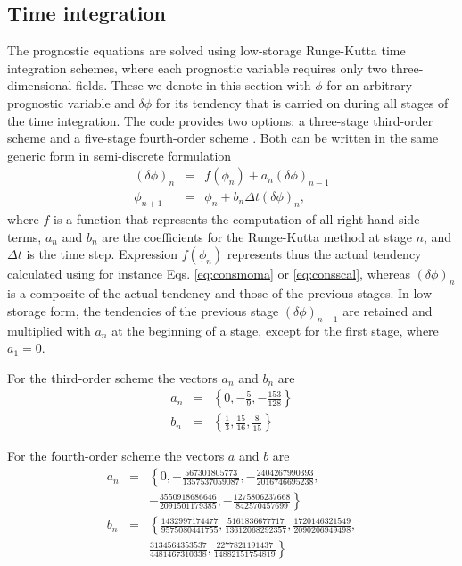 \documentclass[gmd]{copernicus}
\begin{document}
\subsection{Time integration}
The prognostic equations are solved using low-storage Runge-Kutta time integration schemes, where each prognostic variable requires only two three-dimensional fields. These we denote in this section with $\phi$ for an arbitrary prognostic variable and $\delta \phi$ for its tendency that is carried on during all stages of the time integration. The code provides two options: a three-stage third-order scheme \citep{Williamson1980} and a five-stage fourth-order scheme \citep{Carpenter1994}. Both can be written in the same generic form in semi-discrete formulation
\begin{eqnarray}
\left( \delta \phi \right)_n & = & f \left( \phi_n \right) + a_n \left( \delta \phi \right)_{n-1} \\
\phi_{n+1} & = & \phi_n + b_n \Delta t \left( \delta \phi \right)_{n},
\end{eqnarray}
where $f$ is a function that represents the computation of all right-hand side terms, $a_n$ and $b_n$ are the coefficients for the Runge-Kutta method at stage $n$, and $\Delta t$ is the time step. Expression $f \left( \phi_n \right)$ represents thus the actual tendency calculated using for instance Eqs. \ref{eq:consmoma} or \ref{eq:consscal}, whereas $(\delta \phi)_n$ is a composite of the actual tendency and those of the previous stages. In low-storage form, the tendencies of the previous stage $\left( \delta \phi \right)_{n-1}$ are retained and multiplied with $a_n$ at the beginning of a stage, except for the first stage, where $a_1 = 0$. 

For the third-order scheme the vectors $a_n$ and $b_n$ are
\begin{eqnarray}
a_n & = & \left\{0, -\frac{5}{9}, -\frac{153}{128} \right\}\\
b_n & = & \left\{\frac{1}{3}, \frac{15}{16}, \frac{8}{15} \right\}
\end{eqnarray}

For the fourth-order scheme the vectors $a$ and $b$ are
\begin{eqnarray}
\nonumber a_n & = & \left\{0, -\frac{567301805773}{1357537059087},
-\frac{2404267990393}{2016746695238},\right.\\
& & \left. -\frac{3550918686646}{2091501179385},
-\frac{1275806237668}{842570457699} \right\}\\
\nonumber b_n & = & \left\{\frac{1432997174477}{9575080441755}, \frac{5161836677717}{13612068292357},
\frac{1720146321549}{2090206949498},\right.\\
& & \left. \frac{3134564353537}{4481467310338},
\frac{2277821191437}{14882151754819} \right\}
\end{eqnarray}
\end{document}
